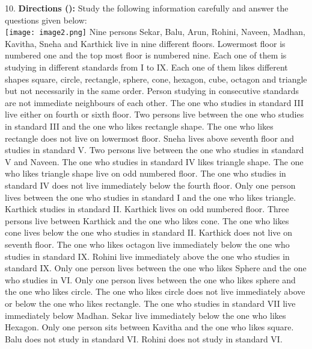 \documentclass[
]{article}
\begin{document}
10. \textbf{Directions ():} Study the following information carefully and answer the questions given
below:\\
\texttt{[image: image2.png]}
Nine persons Sekar, Balu, Arun, Rohini, Naveen, Madhan, Kavitha, Sneha and Karthick live
in nine different floors. Lowermost floor is numbered one and the top most floor is
numbered nine. Each one of them is studying in different standards from I to IX. Each one of
them likes different shapes square, circle, rectangle, sphere, cone, hexagon, cube, octagon
and triangle but not necessarily in the same order. Person studying in consecutive standards
are not immediate neighbours of each other. The one who studies in standard III live either
on fourth or sixth floor. Two persons live between the one who studies in standard III and
the one who likes rectangle shape. The one who likes rectangle does not live on lowermost
floor. Sneha lives above seventh floor and studies in standard V. Two persons live between
the one who studies in standard V and Naveen. The one who studies in standard IV likes
triangle shape. The one who likes triangle shape live on odd numbered floor. The one who
studies in standard IV does not live immediately below the fourth floor. Only one person
lives between the one who studies in standard I and the one who likes triangle. Karthick
studies in standard II. Karthick lives on odd numbered floor. Three persons live between
Karthick and the one who likes cone. The one who likes cone lives below the one who
studies in standard II. Karthick does not live on seventh floor. The one who likes octagon
live immediately below the one who studies in standard IX. Rohini live immediately above
the one who studies in standard IX. Only one person lives between the one who likes Sphere
and the one who studies in VI. Only one person lives between the one who likes sphere and
the one who likes circle. The one who likes circle does not live immediately above or below
the one who likes rectangle. The one who studies in standard VII live immediately below
Madhan. Sekar live immediately below the one who likes Hexagon. Only one person sits
between Kavitha and the one who likes square. Balu does not study in standard VI. Rohini
does not study in standard VI.\\
\end{document}
